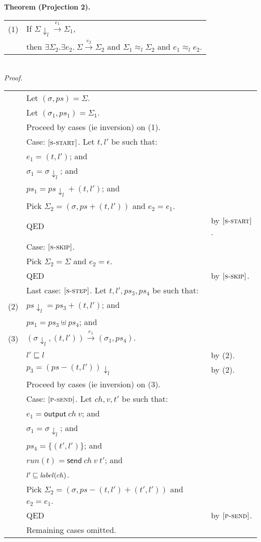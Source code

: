 \documentclass{article}
\newcommand{\rn}[1]{\text{\textsc{[#1]}}}
\newcommand{\tsteparrow}[1]{\overset{#1}{\longrightarrow}}
\newcommand{\tstep}[3]{#2\tsteparrow{#1}#3}
\newcommand{\ssteparrow}[1]{\overset{#1}{\longrightarrow}}
\newcommand{\sstep}[3]{#2\ssteparrow{#1}#3}
\newcommand{\s}[1]{\text{\textit{#1}}}
\newcommand{\process}[2]{(#1,#2)}
\newcommand{\opsend}[3]{\textsf{send}~#1~#2~#3}
\newcommand{\evsend}[2]{\textsf{output}~#1~#2}
\newcommand{\proj}[2]{#1{\downarrow_{#2}}}
\newcommand{\lequiv}[3]{#2\approx_{#1}#3}
\begin{document}
\newpage
\noindent
%
%
\textbf{Theorem (Projection 2).}
\\
\begin{tabular}{l@{$\qquad$}l}
  (1) & If $\sstep{e_1}{\proj{\Sigma}{l}}{\Sigma_1}$,
\\
      & then $\exists \Sigma_2.\exists e_2.~\sstep{e_2}{\Sigma}{\Sigma_2}$
        and $\lequiv{l}{\Sigma_1}{\Sigma_2}$
        and $\lequiv{l}{e_1}{e_2}$.
\end{tabular}
\\
\textit{Proof.}
\\
\begin{tabular}{l@{$\qquad$}l@{\qquad}l}
        & Let $(\sigma,ps)=\Sigma$.
\\
        & Let $(\sigma_1,ps_1)=\Sigma_1$.
\\
        & Proceed by cases (ie inversion) on (1).
\\
        & Case: $\rn{s-start}$. Let $t,l'$ be such that:
\\
        & \z $e_1=\process{t}{l'}$; and
\\
        & \z $\sigma_1=\proj{\sigma}{l}$; and
\\
        & \z $ps_1=\proj{ps}{l}+\process{t}{l'}$; and
\\
        & \z Pick $\Sigma_2 = (\sigma,ps+\process{t}{l'})$ and $e_2=e_1$.
\\
        & \z QED
        & by $\rn{s-start}$.
\\
        & Case: $\rn{s-skip}$.
\\
        & \z Pick $\Sigma_2=\Sigma$ and $e_2=\epsilon$.
\\
        & \z QED
        & by $\rn{s-skip}$.
\\
        & Last case: $\rn{s-step}$. Let $t,l',ps_3,ps_4$ be such that:
\\
  (2)   & $\proj{ps}{l}=ps_3+\process{t}{l'}$; and
\\
        & $ps_1=ps_3\uplus ps_4$; and
\\
  (3)   & $\tstep{e_1}{(\proj{\sigma}{l},\process{t}{l'})}{(\sigma_1,ps_4)}$.
\\
        & $l'\sqsubseteq l$
        & by (2).
\\
        & $p_3 = \proj{(ps-\process{t}{l'})}{l}$
        & by (2).
\\
        & Proceed by cases (ie inversion) on (3).
\\
        & Case: $\rn{p-send}$. Let $ch,v,t'$ be such that:
\\
        & \z $e_1=\evsend{ch}{v}$; and
\\
        & \z $\sigma_1=\proj{\sigma}{l}$; and
\\
        & \z $ps_4=\{\process{t'}{l'}\}$; and
\\
        & \z $run(t)=\opsend{ch}{v}{t'}$; and
\\
        & \z $l'\sqsubseteq\s{label}(ch)$.
\\
        & \z Pick $\Sigma_2 = (\sigma, ps-\process{t}{l'}+\process{t'}{l'})$ and $e_2=e_1$.
\\
        & \z QED
        & by $\rn{p-send}$.
\\
        & Remaining cases omitted.
\end{tabular}
\end{document}
